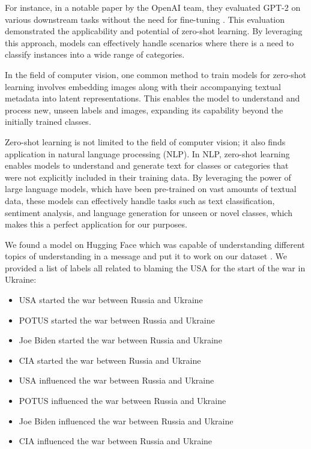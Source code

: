 For instance, in a notable paper by the OpenAI team, they evaluated GPT-2 on various downstream tasks without the need for fine-tuning \cite{Radford2019LanguageMA}. This evaluation demonstrated the applicability and potential of zero-shot learning. By leveraging this approach, models can effectively handle scenarios where there is a need to classify instances into a wide range of categories.

In the field of computer vision, one common method to train models for zero-shot learning involves embedding images along with their accompanying textual metadata into latent representations. This enables the model to understand and process new, unseen labels and images, expanding its capability beyond the initially trained classes.

Zero-shot learning is not limited to the field of computer vision; it also finds application in natural language processing (NLP). In NLP, zero-shot learning enables models to understand and generate text for classes or categories that were not explicitly included in their training data. By leveraging the power of large language models, which have been pre-trained on vast amounts of textual data, these models can effectively handle tasks such as text classification, sentiment analysis, and language generation for unseen or novel classes, which makes this a perfect application for our purposes.

We found a model on Hugging Face which was capable of understanding different topics of understanding in a message and put it to work on our dataset \cite{ZS}. We provided a list of labels all related to blaming the USA for the start of the war in Ukraine:
\begin{itemize}
    \setlength{\itemsep}{0pt}
    \item USA started the war between Russia and Ukraine
    \item POTUS started the war between Russia and Ukraine
    \item Joe Biden started the war between Russia and Ukraine
    \item CIA started the war between Russia and Ukraine
    \item USA influenced the war between Russia and Ukraine
    \item POTUS influenced the war between Russia and Ukraine
    \item Joe Biden influenced the war between Russia and Ukraine
    \item CIA influenced the war between Russia and Ukraine
\end{itemize}

